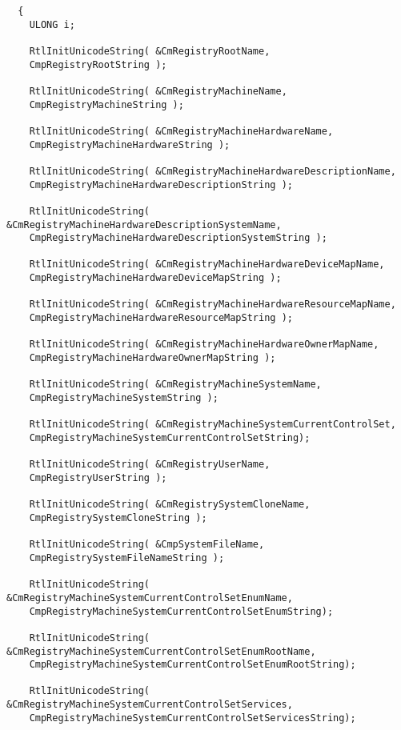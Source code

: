 \begin{listing}
  \begin{verbatim}
  {
    ULONG i;

    RtlInitUnicodeString( &CmRegistryRootName,
    CmpRegistryRootString );

    RtlInitUnicodeString( &CmRegistryMachineName,
    CmpRegistryMachineString );

    RtlInitUnicodeString( &CmRegistryMachineHardwareName,
    CmpRegistryMachineHardwareString );

    RtlInitUnicodeString( &CmRegistryMachineHardwareDescriptionName,
    CmpRegistryMachineHardwareDescriptionString );

    RtlInitUnicodeString( &CmRegistryMachineHardwareDescriptionSystemName,
    CmpRegistryMachineHardwareDescriptionSystemString );

    RtlInitUnicodeString( &CmRegistryMachineHardwareDeviceMapName,
    CmpRegistryMachineHardwareDeviceMapString );

    RtlInitUnicodeString( &CmRegistryMachineHardwareResourceMapName,
    CmpRegistryMachineHardwareResourceMapString );

    RtlInitUnicodeString( &CmRegistryMachineHardwareOwnerMapName,
    CmpRegistryMachineHardwareOwnerMapString );

    RtlInitUnicodeString( &CmRegistryMachineSystemName,
    CmpRegistryMachineSystemString );

    RtlInitUnicodeString( &CmRegistryMachineSystemCurrentControlSet,
    CmpRegistryMachineSystemCurrentControlSetString);

    RtlInitUnicodeString( &CmRegistryUserName,
    CmpRegistryUserString );

    RtlInitUnicodeString( &CmRegistrySystemCloneName,
    CmpRegistrySystemCloneString );

    RtlInitUnicodeString( &CmpSystemFileName,
    CmpRegistrySystemFileNameString );

    RtlInitUnicodeString( &CmRegistryMachineSystemCurrentControlSetEnumName,
    CmpRegistryMachineSystemCurrentControlSetEnumString);

    RtlInitUnicodeString( &CmRegistryMachineSystemCurrentControlSetEnumRootName,
    CmpRegistryMachineSystemCurrentControlSetEnumRootString);

    RtlInitUnicodeString( &CmRegistryMachineSystemCurrentControlSetServices,
    CmpRegistryMachineSystemCurrentControlSetServicesString);


\end{verbatim}
\end{listing}
